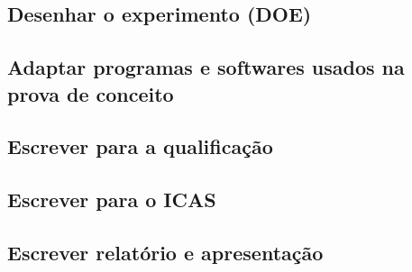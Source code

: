 \subsection{Desenhar o experimento (DOE)}
\subsection{Adaptar programas e softwares usados na prova de conceito}
\subsection{Escrever para a qualificação}
\subsection{Escrever para o ICAS}
\subsection{Escrever relatório e apresentação}